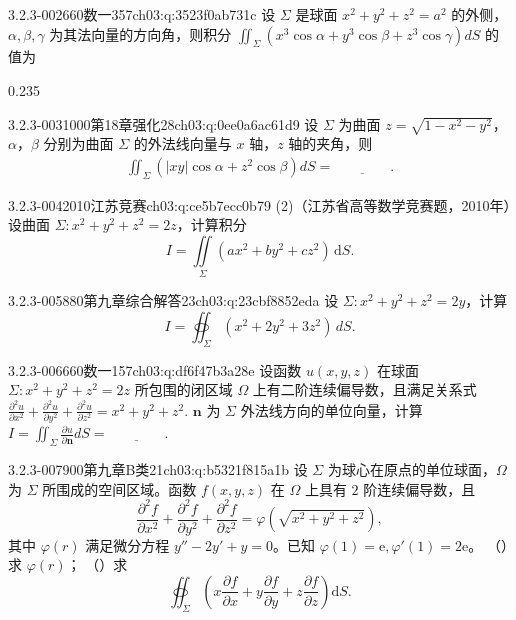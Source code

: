 \begin{q}{3.2.3-002}{660数一357}{ch03:q:3523f0ab731c}
设 $\Sigma$ 是球面 $x^2+y^2+z^2=a^2$ 的外侧，$\alpha,\beta,\gamma$ 为其法向量的方向角，则积分
$\displaystyle \iint_{\Sigma}(x^3\cos\alpha+y^3\cos\beta+z^3\cos\gamma)dS$
的值为
\begin{opts}{0.235}
\hfill{}\hfill{}\hfill{}
\end{opts}
\end{q}

\begin{q}{3.2.3-003}{1000第18章强化28}{ch03:q:0ee0a6ac61d9}
设 $\Sigma$ 为曲面 $z=\sqrt{1-x^2-y^2}$，$\alpha$，$\beta$ 分别为曲面 $\Sigma$ 的外法线向量与 $x$ 轴，$z$ 轴的夹角，则
\[
\begin{aligned}
\iint_{\Sigma}\left(|xy|\cos\alpha+z^2\cos\beta\right)dS=\underline{\hspace{4em}}.
\end{aligned}
\]
\end{q}

\begin{q}{3.2.3-004}{2010江苏竞赛}{ch03:q:ce5b7ecc0b79}
(2)（江苏省高等数学竞赛题，2010年）设曲面 $\Sigma:x^{2}+y^{2}+z^{2}=2z$，计算积分
\[
I=\iint\limits_{\Sigma}(a x^{2}+b y^{2}+c z^{2})\,\mathrm{d}S.
\]
\end{q}

\begin{q}{3.2.3-005}{880第九章综合解答23}{ch03:q:23cbf8852eda}
设 $\Sigma: x^2+y^2+z^2=2y$，计算
\[
I=\oiint_{\Sigma}(x^2+2y^2+3z^2)\,dS.
\]
\end{q}

\begin{q}{3.2.3-006}{660数一157}{ch03:q:df6f47b3a28e}
设函数 $u(x,y,z)$ 在球面 $\Sigma:x^2+y^2+z^2=2z$ 所包围的闭区域 $\Omega$ 上有二阶连续偏导数，且满足关系式
$\displaystyle \frac{\partial^2 u}{\partial x^2}+\frac{\partial^2 u}{\partial y^2}+\frac{\partial^2 u}{\partial z^2}=x^2+y^2+z^2.$
$\boldsymbol{n}$ 为 $\Sigma$ 外法线方向的单位向量，计算 $\displaystyle I=\iint_{\Sigma}\frac{\partial u}{\partial \boldsymbol{n}}dS=\underline{\hspace{4em}}$.
\end{q}

\begin{q}{3.2.3-007}{900第九章B类21}{ch03:q:b5321f815a1b}
设 $\Sigma$ 为球心在原点的单位球面，$\Omega$ 为 $\Sigma$ 所围成的空间区域。函数 $f(x,y,z)$ 在 $\Omega$ 上具有 $2$ 阶连续偏导数，且
\[\frac{\partial^2 f}{\partial x^2}+\frac{\partial^2 f}{\partial y^2}+\frac{\partial^2 f}{\partial z^2}=\varphi(\sqrt{x^2+y^2+z^2}),\]
其中 $\varphi(r)$ 满足微分方程 $y''-2y'+y=0$。已知 $\varphi(1)=\mathrm{e},\varphi'(1)=2\mathrm{e}$。
（）求 $\varphi(r)$；
（）求
\[\oiint_{\Sigma}\left(x\frac{\partial f}{\partial x}+y\frac{\partial f}{\partial y}+z\frac{\partial f}{\partial z}\right)\mathrm{d}S.\]
\end{q}
